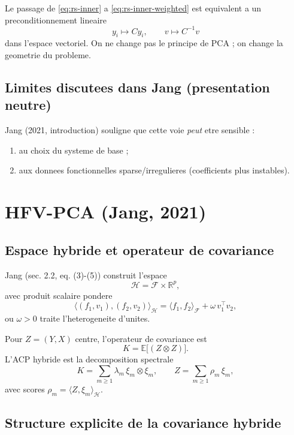 \documentclass[11pt,a4paper]{article}
\begin{document}
Le passage de \eqref{eq:rs-inner} a \eqref{eq:rs-inner-weighted} est
equivalent a un preconditionnement lineaire
\[
y_i\mapsto C y_i,\qquad v\mapsto C^{-1}v
\]
dans l'espace vectoriel. On ne change pas le principe de PCA ; on change la
geometrie du probleme.

\subsection{Limites discutees dans Jang (presentation neutre)}

Jang (2021, introduction) souligne que cette voie \emph{peut} etre sensible :
\begin{enumerate}[leftmargin=1.5em]
  \item au choix du systeme de base ;
  \item aux donnees fonctionnelles sparse/irregulieres (coefficients plus
  instables).
\end{enumerate}

\section{HFV-PCA (Jang, 2021)}
\label{sec:hfv}

\subsection{Espace hybride et operateur de covariance}

Jang (sec. 2.2, eq. (3)-(5)) construit l'espace
\[
\mathcal{H}=\mathcal{F}\times\mathbb{R}^p,
\]
avec produit scalaire pondere
\begin{equation}
\langle (f_1,v_1),(f_2,v_2)\rangle_{\mathcal{H}}
=\langle f_1,f_2\rangle_{\mathcal{F}}+\omega\,v_1^\top v_2,
\label{eq:hfv-inner}
\end{equation}
ou $\omega>0$ traite l'heterogeneite d'unites.

Pour $Z=(Y,X)$ centre, l'operateur de covariance est
\[
K=\mathbb{E}\big[(Z\otimes Z)\big].
\]
L'ACP hybride est la decomposition spectrale
\begin{equation}
K=\sum_{m\ge1}\lambda_m\,\xi_m\otimes\xi_m,\qquad
Z=\sum_{m\ge1}\rho_m\,\xi_m,
\label{eq:hfv-decomp}
\end{equation}
avec scores $\rho_m=\langle Z,\xi_m\rangle_{\mathcal{H}}$.

\subsection{Structure explicite de la covariance hybride}
\end{document}
